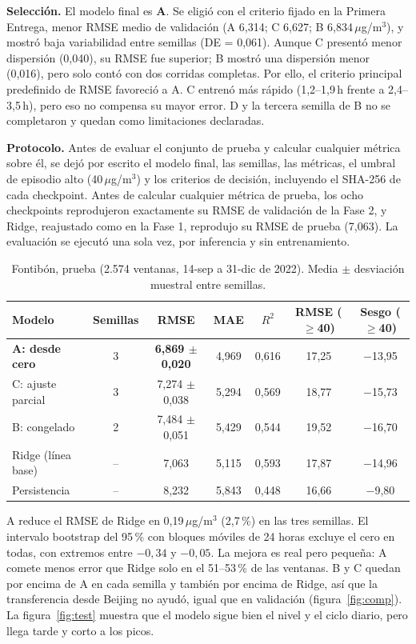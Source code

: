\documentclass[11pt,letterpaper]{article}
\newcommand{\ugm}{\,$\mu$g/m$^3$}
\begin{document}
\textbf{Selección.} El modelo final es \textbf{A}. Se eligió con el criterio fijado en la Primera Entrega,
menor RMSE medio de validación (A 6,314; C 6,627; B 6,834\ugm), y mostró baja variabilidad entre semillas
(DE = 0,061). Aunque C presentó menor dispersión (0,040), su RMSE fue superior; B mostró una dispersión
menor (0,016), pero solo contó con dos corridas completas. Por ello, el criterio principal predefinido de
RMSE favoreció a A. C entrenó más rápido (1,2–1,9\,h frente a 2,4–3,5\,h), pero eso no compensa su
mayor error. D y la tercera semilla de B no se completaron y quedan como limitaciones declaradas.

\textbf{Protocolo.} Antes de evaluar el conjunto de prueba y calcular cualquier métrica sobre él, se dejó por escrito el modelo final, las
semillas, las métricas, el umbral de episodio alto (40\ugm) y los criterios de decisión,
incluyendo el SHA-256 de cada checkpoint. Antes de calcular cualquier métrica de prueba, los ocho
checkpoints reprodujeron exactamente su RMSE de validación de la Fase 2, y Ridge, reajustado como en la
Fase 1, reprodujo su RMSE de prueba (7,063). La evaluación se ejecutó una sola vez, por inferencia y sin
entrenamiento.

\begin{table}[h]
\centering
\caption{Fontibón, prueba (2.574 ventanas, 14-sep a 31-dic de 2022). Media $\pm$ desviación muestral entre semillas.}
\small
\begin{tabular}{lcccccc}
\toprule
Modelo & Semillas & RMSE & MAE & $R^2$ & RMSE ($\geq$40) & Sesgo ($\geq$40)\\
\midrule
\textbf{A: desde cero} & 3 & \textbf{6,869 $\pm$ 0,020} & 4,969 & 0,616 & 17,25 & $-$13,95\\
C: ajuste parcial & 3 & 7,274 $\pm$ 0,038 & 5,294 & 0,569 & 18,77 & $-$15,73\\
B: congelado & 2 & 7,484 $\pm$ 0,051 & 5,429 & 0,544 & 19,52 & $-$16,70\\
Ridge (línea base) & -- & 7,063 & 5,115 & 0,593 & 17,87 & $-$14,96\\
Persistencia & -- & 8,232 & 5,843 & 0,448 & 16,66 & $-$9,80\\
\bottomrule
\end{tabular}
\end{table}

A reduce el RMSE de Ridge en 0,19\ugm{} (2,7\,\%) en las tres semillas. El intervalo bootstrap del 95\,\%
con bloques móviles de 24 horas excluye el cero en todas, con extremos entre $-0{,}34$ y $-0{,}05$. La
mejora es real pero pequeña: A comete menos error que Ridge solo en el 51–53\,\% de las ventanas.
B y C quedan por encima de A en cada semilla y también por encima de Ridge, así que la transferencia desde
Beijing no ayudó, igual que en validación (figura~\ref{fig:comp}). La figura~\ref{fig:test} muestra que el modelo sigue bien el
nivel y el ciclo diario, pero llega tarde y corto a los picos.
\end{document}
